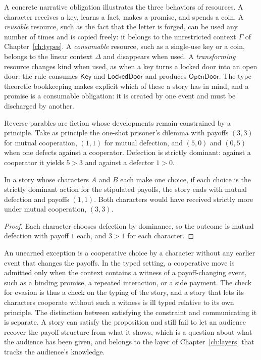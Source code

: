 A concrete narrative obligation illustrates the three behaviors of resources. A character receives a key, learns a fact, makes a promise, and spends a coin. A \emph{reusable} resource, such as the fact that the letter is forged, can be used any number of times and is copied freely: it belongs to the unrestricted context $\Gamma$ of Chapter~\ref{ch:types}. A \emph{consumable} resource, such as a single-use key or a coin, belongs to the linear context $\Delta$ and disappears when used. A \emph{transforming} resource changes kind when used, as when a key turns a locked door into an open door: the rule consumes $\mathsf{Key}$ and $\mathsf{LockedDoor}$ and produces $\mathsf{OpenDoor}$. The type-theoretic bookkeeping makes explicit which of these a story has in mind, and a promise is a consumable obligation: it is created by one event and must be discharged by another.

Reverse parables are fiction whose developments remain constrained by a principle. Take as principle the one-shot prisoner's dilemma with payoffs $(3,3)$ for mutual cooperation, $(1,1)$ for mutual defection, and $(5,0)$ and $(0,5)$ when one defects against a cooperator. Defection is strictly dominant: against a cooperator it yields $5>3$ and against a defector $1>0$.

\begin{proposition}\label{prop:parable}
In a story whose characters $A$ and $B$ each make one choice, if each choice is the strictly dominant action for the stipulated payoffs, the story ends with mutual defection and payoffs $(1,1)$. Both characters would have received strictly more under mutual cooperation, $(3,3)$.
\end{proposition}

\begin{proof}
Each character chooses defection by dominance, so the outcome is mutual defection with payoff $1$ each, and $3>1$ for each character.
\end{proof}

An unearned exception is a cooperative choice by a character without any earlier event that changes the payoffs. In the typed setting, a cooperative move is admitted only when the context contains a witness of a payoff-changing event, such as a binding promise, a repeated interaction, or a side payment. The check for evasion is thus a check on the typing of the story, and a story that lets its characters cooperate without such a witness is ill typed relative to its own principle. The distinction between satisfying the constraint and communicating it is separate. A story can satisfy the proposition and still fail to let an audience recover the payoff structure from what it shows, which is a question about what the audience has been given, and belongs to the layer of Chapter~\ref{ch:layers} that tracks the audience's knowledge.

